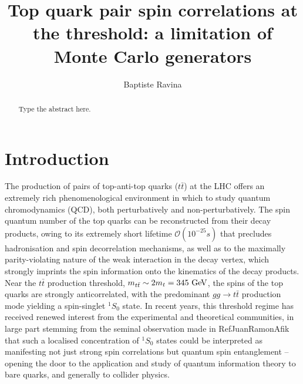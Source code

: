 \documentclass[aps,prd,twocolumn,floatfix,superscriptaddress,longbibliography,10pt]{revtex4-2}
\newcommand{\ttbar}{{\ensuremath{t\bar{t}}}\xspace}
\newcommand{\GeV}{\ensuremath{\text{Ge\kern -0.1em V}}}
\newcommand{\mttbar}{\ensuremath{m_{\ttbar}}\xspace}
\begin{document}
\title{Top quark pair spin correlations at the threshold: a limitation of Monte Carlo generators}

\author{Baptiste Ravina}

\begin{abstract}
Type the abstract here.
\end{abstract}

\maketitle

\section{Introduction}

The production of pairs of top-anti-top quarks (\ttbar) at the LHC offers an extremely rich phenomenological environment in which to study quantum chromodynamics (QCD), both perturbatively and non-perturbatively.
The spin quantum number of the top quarks can be reconstructed from their decay products, owing to its extremely short lifetime $\mathcal{O}(10^{-25}s)$ that precludes hadronisation and spin decorrelation mechanisms, as well as to the maximally parity-violating nature of the weak interaction in the decay vertex, which strongly imprints the spin information onto the kinematics of the decay products.
Near the \ttbar production threshold, $\mttbar\sim 2m_t=345~\GeV$, the spins of the top quarks are strongly anticorrelated, with the predominant $gg\to\ttbar$ production mode yielding a spin-singlet $^{1}S_0$ state.
In recent years, this threshold regime has received renewed interest from the experimental and theoretical communities, in large part stemming from the seminal observation made in RefJuanRamonAfik that such a localised concentration of $^{1}S_0$ states could be interpreted as manifesting not just strong spin correlations but quantum spin entanglement -- opening the door to the application and study of quantum information theory to bare quarks, and generally to collider physics.
\end{document}
